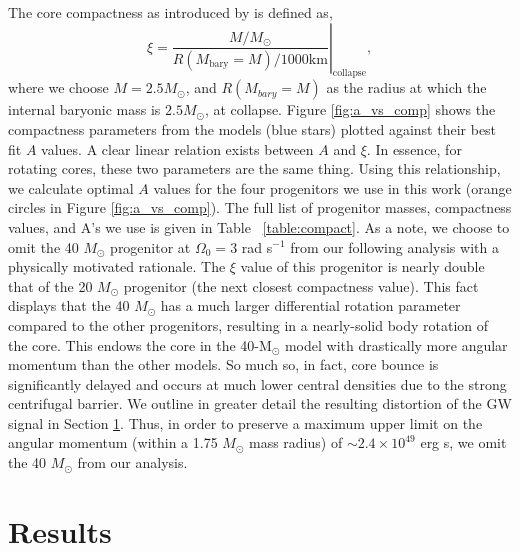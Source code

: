 \documentclass[twocolumn,times]{aastex62}  %
\newcommand{\Msun}{\ensuremath{\mathrm{M}_\odot}\xspace}
\begin{document}
The core compactness as introduced by \citet{oconnor:2011} is defined as,
\begin{equation}
    \xi = \left.\frac{M/M_{\odot}}{R(M_\mathrm{bary}=M)/1000 \text{km}}\right\vert_\mathrm{collapse} ,
\end{equation} 
where we choose $M = 2.5 M_\odot$, and $R(M_{bary}=M) $ as the radius at which the internal baryonic mass is $2.5M_\odot$, at collapse.  
Figure \ref{fig:a_vs_comp} shows the compactness parameters from the \citet{heger:2005} models (blue stars) plotted against their best fit $A$ values.
A clear linear relation exists between $A$ and $\xi$.  
In essence, for rotating cores, these two parameters are the same thing.
Using this relationship, we calculate optimal $A$ values for the four \citet{Suk:2016} progenitors we use in this work (orange circles in Figure \ref{fig:a_vs_comp}).  
The full list of progenitor masses, compactness values, and A's we use is given in Table ~\ref{table:compact}.  
As a note, we choose to omit the 40 $M_\odot$ progenitor at $\Omega_0 = 3$ rad s$^{-1}$ from our following analysis with a physically motivated rationale.  The $\xi$ value of this progenitor is nearly double that of the 20 $M_\odot$ progenitor (the next closest compactness value).  This fact displays that the 40 $M_\odot$ has a much larger differential rotation parameter compared to the other progenitors, resulting in a nearly-solid body rotation of the core. This endows the core in the 40-\Msun model with drastically more angular momentum than the other models.  
So much so, in fact, core bounce is significantly delayed and occurs at much lower central densities due to the strong centrifugal barrier.
We outline in greater detail the resulting distortion of the GW signal in Section \ref{sec:results}.  Thus, in order to preserve a maximum upper limit on the angular momentum (within a 1.75 $M_\odot$ mass radius) of $\sim 2.4\times 10^{49}$ erg s, we omit the 40 $M_\odot$ from our analysis.  \\




%


\section{Results}
\label{sec:results}
\end{document}
